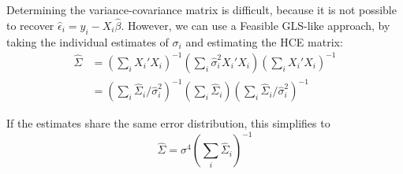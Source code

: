 \documentclass[12pt, oneside]{amsart}
\begin{document}
Determining the variance-covariance matrix is difficult, because it is
not possible to recover $\hat\epsilon_i = y_i - X_i \hat\beta$.  However,
we can use a Feasible GLS-like approach, by taking the individual
estimates of $\sigma_i$ and estimating the HCE matrix:
\begin{align*}
  \hat\Sigma &= \left(\sum_i X_i' X_i\right)^{-1} \left(\sum_i \hat\sigma_i^2
               X_i' X_i\right) \left(\sum_i X_i' X_i\right)^{-1} \\
             &= \left(\sum_i \hat\Sigma_i / \hat\sigma_i^2\right)^{-1}
               \left(\sum_i \hat\Sigma_i \right) \left(\sum_i \hat\Sigma_i / \hat\sigma_i^2\right)^{-1}
\end{align*}

If the estimates share the same error distribution, this simplifies to
\[
\hat\Sigma = \sigma^4 \left(\sum_i \hat\Sigma_i\right)^{-1}
\]
\end{document}
